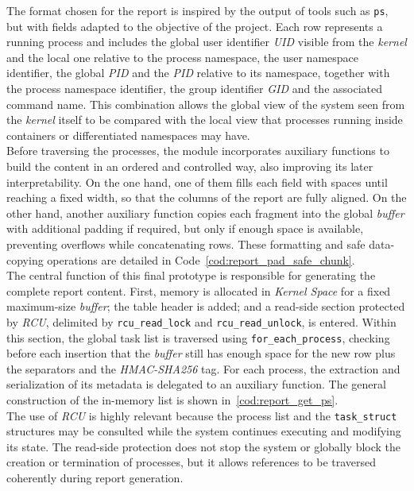 The format chosen for the report is inspired by the output of tools such as \texttt{ps}, but with fields adapted to the objective of the project.
Each row represents a running process and includes the global user identifier \textit{UID} visible from the \textit{kernel} and the local one relative to the process namespace, the user namespace identifier, the global \textit{PID} and the \textit{PID} relative to its namespace, together with the process namespace identifier, the group identifier \textit{GID} and the associated command name.
This combination allows the global view of the system seen from the \textit{kernel} itself to be compared with the local view that processes running inside containers or differentiated namespaces may have.\\

Before traversing the processes, the module incorporates auxiliary functions to build the content in an ordered and controlled way, also improving its later interpretability.
On the one hand, one of them fills each field with spaces until reaching a fixed width, so that the columns of the report are fully aligned.
On the other hand, another auxiliary function copies each fragment into the global \textit{buffer} with additional padding if required, but only if enough space is available, preventing overflows while concatenating rows.
These formatting and safe data-copying operations are detailed in Code~\ref{cod:report_pad_safe_chunk}.\\

The central function of this final prototype is responsible for generating the complete report content.
First, memory is allocated in \textit{Kernel Space} for a fixed maximum-size \textit{buffer}; the table header is added; and a read-side section protected by \textit{RCU}, delimited by \verb|rcu_read_lock| and \verb|rcu_read_unlock|, is entered.
Within this section, the global task list is traversed using \texttt{for\_each\_process}, checking before each insertion that the \textit{buffer} still has enough space for the new row plus the separators and the \textit{HMAC-SHA256} tag.
For each process, the extraction and serialization of its metadata is delegated to an auxiliary function.
The general construction of the in-memory list is shown in~\ref{cod:report_get_ps}.\\

The use of \textit{RCU} is highly relevant because the process list and the \texttt{task\_struct} structures may be consulted while the system continues executing and modifying its state.
The read-side protection does not stop the system or globally block the creation or termination of processes, but it allows references to be traversed coherently during report generation.\\


